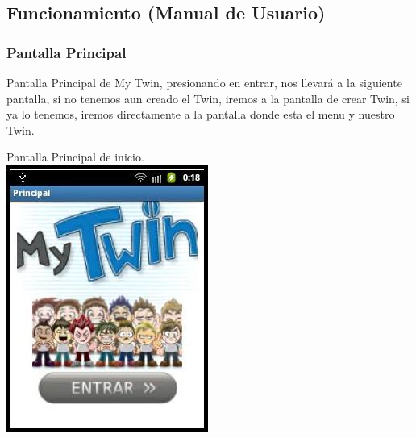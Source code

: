 \documentclass[12pt]{article}
\begin{document}
{{{\begin{flushleft}
{\begin{flushright}
\end{flushright}
}


\end{flushleft}

\newpage
\begin{flushleft}
\subsection{Funcionamiento (Manual de Usuario)}
\subsubsection{Pantalla Principal}
\vspace{0.1in}
\normalsize
Pantalla Principal de My Twin, presionando en entrar, nos llevar\'a a la siguiente pantalla, si no tenemos aun creado el Twin, iremos a la pantalla de crear Twin, si ya lo tenemos, iremos directamente a la pantalla donde esta el menu y nuestro Twin.

\begin{center}
\vspace{0.3in}Pantalla Principal de inicio.\\
\vspace{0.3in}\includegraphics[scale=1.2]{imagenes_android/PPrincipal}\\
\end{center}

\newpage

\end{flushleft}}}}
\end{document}
